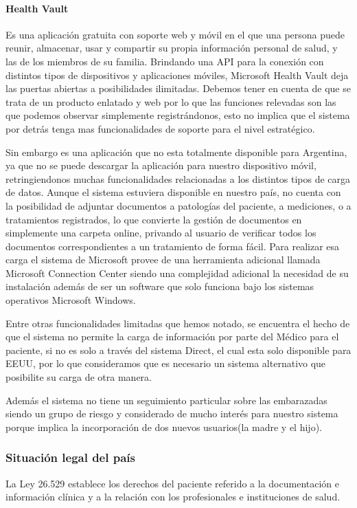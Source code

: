 \paragraph{Health Vault}


	 Es una aplicación gratuita con soporte web y móvil en el que una persona puede reunir, almacenar, usar y compartir su propia información personal de salud, y las de los miembros de su familia. Brindando una API para la conexión con distintos tipos de dispositivos y aplicaciones móviles, Microsoft Health Vault deja las puertas abiertas a posibilidades ilimitadas. 
     Debemos tener en cuenta de que se trata de un producto enlatado y web por lo que las funciones relevadas son las que podemos observar simplemente registrándonos, esto no implica que el sistema por detrás tenga mas funcionalidades de soporte para el nivel estratégico.
     
     Sin embargo es una aplicación que no esta totalmente disponible para Argentina, ya que no se puede descargar la aplicación para nuestro dispositivo móvil, retringiendonos muchas funcionalidades relacionadas a los distintos tipos de carga de datos.
     Aunque el sistema estuviera disponible en nuestro país, no cuenta con la posibilidad de adjuntar documentos a patologías del paciente, a mediciones, o a tratamientos registrados, lo que convierte la gestión de documentos en simplemente una carpeta online, privando al usuario de verificar todos los documentos correspondientes a un tratamiento de forma fácil. Para realizar esa carga el sistema de Microsoft provee de una herramienta adicional llamada Microsoft Connection Center siendo una complejidad adicional la necesidad de su instalación además de ser un software que solo funciona bajo los sistemas operativos Microsoft Windows.
	
    Entre otras funcionalidades limitadas que hemos notado, se encuentra el hecho de que el sistema no permite la carga de información por parte del Médico para el paciente, si no es solo a través del sistema Direct, el cual esta solo disponible para EEUU, por lo que consideramos que es necesario un sistema alternativo que posibilite su carga de otra manera.
    
	Además el sistema no tiene un seguimiento particular sobre las embarazadas siendo un grupo de riesgo y considerado de mucho interés para nuestro sistema porque implica la incorporación de dos nuevos usuarios(la madre y el hijo).
     
\subsubsection{Situación legal del país}   
La Ley 26.529 establece los derechos del paciente referido a la documentación e información clínica y a la relación con los profesionales e instituciones de salud. 

